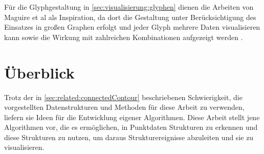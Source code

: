 Für die Glyphgestaltung in \autoref{sec:visualisierung:glyphen} dienen die Arbeiten von Maguire et al als Inspiration, da dort die Gestaltung unter Berücksichtigung des Einsatzes in großen Graphen erfolgt und jeder Glyph mehrere Daten visualisieren kann \cite{maguire2013visualCompression} sowie die Wirkung mit zahlreichen Kombinationen aufgezeigt werden \cite{maguire2012taxonomyBasedGlyphDesign}.


\chapter{Überblick}

Trotz der in \autoref{sec:related:connectedContour} beschriebenen Schwierigkeit, die vorgestellten Datenstrukturen und Methoden für diese Arbeit zu verwenden, liefern sie Ideen für die Entwicklung eigener Algorithmen. Diese Arbeit stellt jene Algorithmen vor, die es ermöglichen, in Punktdaten Strukturen zu erkennen und diese Strukturen zu nutzen, um daraus Strukturereignisse abzuleiten und sie zu visualisieren.



